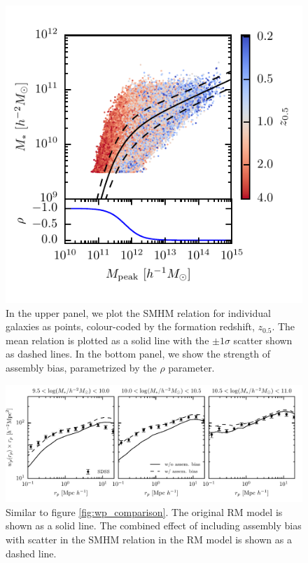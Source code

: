\documentclass[a4paper,fleqn,usenatbib]{mnras}
\begin{document}
\begin{figure}
    \includegraphics{figures/smhm_assem_bias.pdf}
    \caption{In the upper panel, we plot the SMHM relation for individual galaxies as points, colour-coded by the formation redshift, $z_{0.5}$.  The mean relation is plotted as a solid line with the $\pm 1\sigma$ scatter shown as dashed lines.  In the bottom panel, we show the strength of assembly bias, parametrized by the $\rho$ parameter.}
    \label{fig:assem_bias_smhm}
\end{figure} 

\begin{figure}
    \includegraphics{figures/wp_comparison_assem_bias.pdf}
    \caption{Similar to figure \ref{fig:wp_comparison}.  The original RM model is shown as a solid line.  The combined effect of including assembly bias with scatter in the SMHM relation in the RM model is shown as a dashed line.}
    \label{fig:wp_comparison_assem_bias}
\end{figure}
\end{document}
